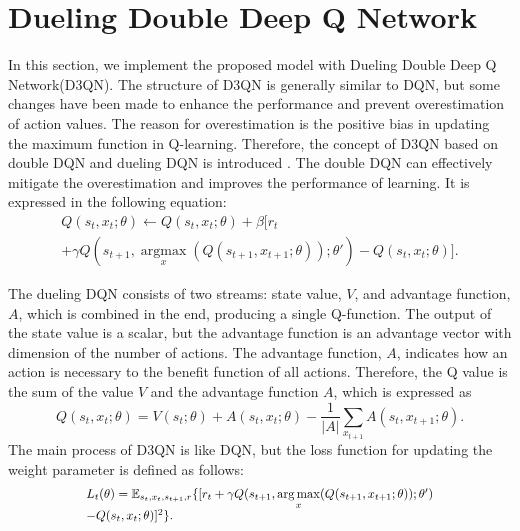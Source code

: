 \documentclass[journal]{IEEEtran}
\begin{document}
	\section{Dueling Double Deep Q Network}
		In this section, we implement the proposed model with Dueling Double Deep Q Network(D3QN). The structure of D3QN is generally similar to DQN, but some changes have been made to enhance the performance and prevent overestimation of action values. The reason for overestimation is the positive bias in updating the maximum function in Q-learning. Therefore, the concept of D3QN based on double DQN and dueling DQN is introduced \cite{D3QN_32}. The double DQN can effectively mitigate the overestimation and improves the performance of learning. It is expressed in the following equation:
		\begin{equation}
			\begin{array}{l}
				Q({s_t},{x_t};\theta ) \leftarrow Q({s_t},{x_t};\theta ) + \beta [{r_t}\\
				+ \gamma Q({s_{t + 1}},\mathop {\arg \max }\limits_x (Q({s_{t + 1}},{x_{t + 1}};\theta ));\theta ') - Q({s_t},{x_t};\theta )].
			\end{array}
		\end{equation}
	
		The dueling DQN consists of two streams: state value, $V$, and advantage function, $A$, which is combined in the end, producing a single Q-function. The output of the state value is a scalar, but the advantage function is an advantage vector with dimension of the number of actions. The advantage function, $A$, indicates how an action is necessary to the benefit function of all actions. Therefore, the Q value is the sum of the value $V$ and the advantage function $A$, which is expressed as
		\begin{equation}
			Q({s_t},{x_t};\theta ) = V({s_t};\theta ) + A({s_t},{x_t};\theta ) - \frac{1}{{|A|}}\sum\limits_{{x_{t + 1}}} {A({s_t},{x_{t + 1}};\theta )}.
		\end{equation}
		The main process of D3QN is like DQN, but the loss function for updating the weight parameter is defined as follows:
		\begin{equation}
			\scalebox{0.89}
			{$\begin{array}{l}
				{L_t}(\theta ) = {\mathbb{E}_{{s_t},{x_t},{s_{t + 1}},r}}\{ [{r_t} + \gamma Q({s_{t + 1}},\mathop {\arg \max }\limits_x (Q({s_{t + 1}},{x_{t + 1}};\theta ));\theta ')\\
				- Q({s_t},{x_t};\theta )]^2{\} }.
			\end{array}$}
		\end{equation}
\end{document}
